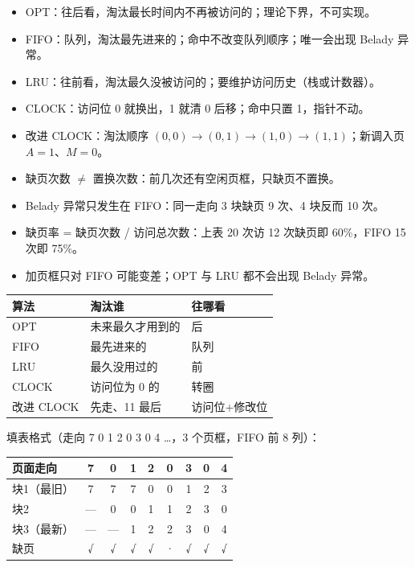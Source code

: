 \documentclass[10pt,a4paper]{ctexart}
\begin{document}
\begin{itemize}

\item OPT：往后看，淘汰最长时间内不再被访问的；理论下界，不可实现。

\item FIFO：队列，淘汰最先进来的；命中不改变队列顺序；唯一会出现 Belady 异常。

\item LRU：往前看，淘汰最久没被访问的；要维护访问历史（栈或计数器）。

\item CLOCK：访问位 0 就换出，1 就清 0 后移；命中只置 1，指针不动。

\item 改进 CLOCK：淘汰顺序 $(0,0)\to(0,1)\to(1,0)\to(1,1)$；新调入页 $A=1$、$M=0$。

\item 缺页次数 $\neq$ 置换次数：前几次还有空闲页框，只缺页不置换。

\item Belady 异常只发生在 FIFO：同一走向 3 块缺页 9 次、4 块反而 10 次。

\item 缺页率 = 缺页次数 / 访问总次数：上表 20 次访 12 次缺页即 60\%，FIFO 15 次即 75\%。

\item 加页框只对 FIFO 可能变差；OPT 与 LRU 都不会出现 Belady 异常。

\end{itemize}

\begin{center}\small
\begin{tabularx}{\linewidth}{@{}l>{\raggedright\arraybackslash}Xl@{}}
\toprule
算法 & 淘汰谁 & 往哪看 \\
\midrule
OPT & 未来最久才用到的 & 后 \\
FIFO & 最先进来的 & 队列 \\
LRU & 最久没用过的 & 前 \\
CLOCK & 访问位为 0 的 & 转圈 \\
改进 CLOCK & 00 先走、11 最后 & 访问位+修改位 \\
\bottomrule
\end{tabularx}
\end{center}

填表格式（走向 7 0 1 2 0 3 0 4 …，3 个页框，FIFO 前 8 列）：

\begin{center}\small
\begin{tabularx}{\linewidth}{@{}>{\raggedright\arraybackslash}Xcccccccc@{}}
\toprule
页面走向 & 7 & 0 & 1 & 2 & 0 & 3 & 0 & 4 \\
\midrule
块1（最旧） & 7 & 7 & 7 & 0 & 0 & 1 & 2 & 3 \\
块2 & — & 0 & 0 & 1 & 1 & 2 & 3 & 0 \\
块3（最新） & — & — & 1 & 2 & 2 & 3 & 0 & 4 \\
缺页 & √ & √ & √ & √ & · & √ & √ & √ \\
\bottomrule
\end{tabularx}
\end{center}
\end{document}

